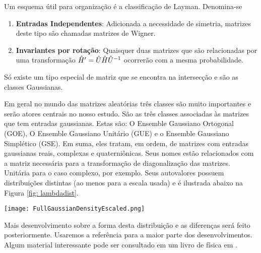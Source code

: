  Um esquema útil para organização é a classificação de Layman. Denomina-se

\begin{enumerate}
	\item \textbf{Entradas Independentes}: Adicionada a necessidade de simetria, matrizes deste tipo são chamadas matrizes de Wigner.
	\item \textbf{Invariantes por rotação}: Quaisquer duas matrizes que são relacionadas por uma transformação $\hat H' = \hat U \hat H \hat U^{-1}$ ocorrerão com a mesma probabilidade.
\end{enumerate}

Só existe um tipo especial de matriz que se encontra na intersecção e são as classes Gaussianas.

Em geral no mundo das matrizes aleatórias três classes são muito importantes e serão atores centrais no nosso estudo. São as três classes associadas às matrizes que tem entradas gaussianas. Estas são: O Ensemble Gaussiano Ortogonal (GOE), O Ensemble Gaussiano Unitário (GUE) e o Ensemble Gaussiano Simplético (GSE). Em suma, eles tratam, em ordem, de matrizes com entradas gaussianas reais, complexas e quaterniônicas. Seus nomes estão relacionados com a matriz necessária para a transformação de diagonalização das matrizes. Unitária para o caso complexo, por exemplo. Seus autovalores possuem distribuições distintas (ao menos para a escala usada) e é ilustrada abaixo na Figura \eqref{fig: lambdadist}.

\begin{center}
	\texttt{[image: FullGaussianDensityEscaled.png]}
	\label{fig: lambdadist}
\end{center}

Mais desenvolvimento sobre a forma desta distribuição e as diferenças será feito posteriormente. Usaremos a referência \cite{Livan_2018} para a maior parte dos desenvolvimentos. Algum material interessante pode ser consultado em um livro de física em \cite{MEHTA1967v}.